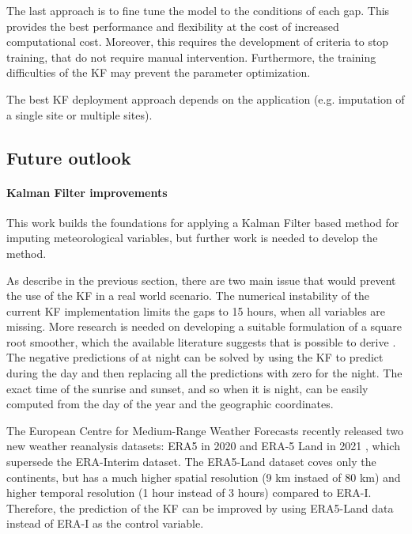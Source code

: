 \documentclass{article}
\let\Oldsubsection\subsection
\renewcommand{\subsection}{\FloatBarrier\Oldsubsection}
\begin{document}
The last approach is to fine tune the model to the conditions of each gap. This provides the best performance and flexibility at the cost of increased computational cost. Moreover, this requires the development of criteria to stop training, that do not require manual intervention. Furthermore, the training difficulties of the KF may prevent the parameter optimization.

The best KF deployment approach depends on the application (e.g. imputation of a single site or multiple sites).

\subsection{Future outlook}

\paragraph{Kalman Filter improvements} This work builds the foundations for applying a Kalman Filter based method for imputing meteorological variables, but further work is needed to develop the method.

As describe in the previous section, there are two main issue that would prevent the use of the KF in a real world scenario.
The numerical instability of the current KF implementation limits the gaps to 15 hours, when all variables are missing.
More research is needed on developing a suitable formulation of a square root smoother, which the available literature suggests that is possible to derive \cite{rutten_square-root_2013, park_new_1996}. 
The negative predictions of  at night can be solved by using the KF to predict  during the day and then replacing all the predictions with zero for the night. The exact time of the sunrise and sunset, and so when it is night, can be easily computed from the day of the year and the geographic coordinates.

The European Centre for Medium-Range Weather Forecasts recently released two new weather reanalysis datasets: ERA5 in 2020 \cite{hersbach_era5_2020} and ERA-5 Land  in 2021 \cite{munoz-sabater_era5-land_2021}, which supersede the ERA-Interim dataset. The ERA5-Land dataset coves only the continents, but has a much higher spatial resolution (9 km instaed of 80 km) and higher temporal resolution (1 hour instead of 3 hours) compared to ERA-I. Therefore, the prediction of the KF can be improved by using ERA5-Land data instead of ERA-I as the control variable.
\end{document}
